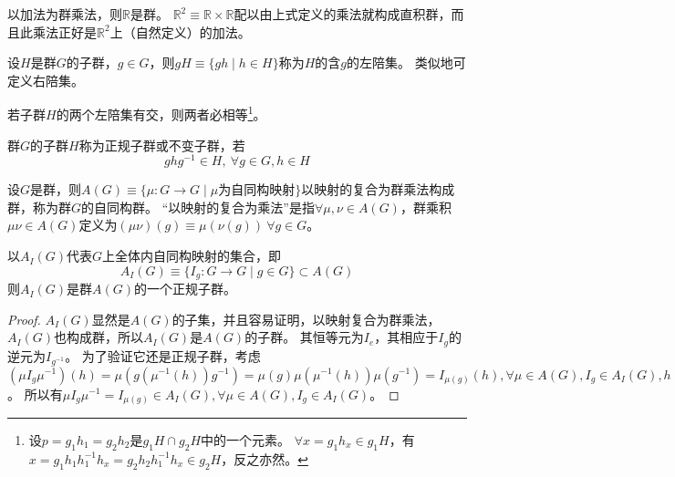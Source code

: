 \begin{example}
    以加法为群乘法，则$\mathbb{R}$是群。
    $\mathbb{R}^2 \equiv \mathbb{R} \times \mathbb{R}$配以由上式定义的乘法就构成直积群，而且此乘法正好是$\mathbb{R}^2$上（自然定义）的加法。
\end{example}

\begin{definition}
    设$H$是群$G$的子群，$g \in G$，则$gH \equiv \{gh \mid h \in H\}$称为$H$的含$g$的左陪集。
    类似地可定义右陪集。
\end{definition}

\begin{note}
    若子群$H$的两个左陪集有交，则两者必相等\footnote{
        设$p = g_1h_1 = g_2h_2$是$g_1H \cap g_2H$中的一个元素。
        $\forall x = g_1h_x \in g_1H$，有$x = g_1h_1h_1^{-1}h_x = g_2h_2h_1^{-1}h_x \in g_2H$，反之亦然。
    }。
\end{note}

\begin{definition}
    群$G$的子群$H$称为正规子群或不变子群，若
    $$ghg^{-1} \in H, ~ \forall g \in G, h \in H$$
\end{definition}

\begin{definition}
    设$G$是群，则$A(G) \equiv \{\mu \colon G \to G \mid \mu \text{为自同构映射}\}$以映射的复合为群乘法构成群，称为群$G$的自同构群。
    ``以映射的复合为乘法''是指$\forall \mu, \nu \in A(G)$，群乘积$\mu\nu \in A(G)$定义为$(\mu\nu)(g) \equiv \mu(\nu(g)) ~ \forall g \in G$。
\end{definition}

\begin{theorem}
    以$A_I(G)$代表$G$上全体内自同构映射的集合，即
    $$A_I(G) \equiv \{I_g \colon G \to G \mid g \in G\} \subset A(G)$$
    则$A_I(G)$是群$A(G)$的一个正规子群。
\end{theorem}

\begin{proof}
    $A_I(G)$显然是$A(G)$的子集，并且容易证明，以映射复合为群乘法，$A_I(G)$也构成群，所以$A_I(G)$是$A(G)$的子群。
    其恒等元为$I_e$，其相应于$I_g$的逆元为$I_{g^{-1}}$。
    为了验证它还是正规子群，考虑$(\mu I_g \mu^{-1})(h) = \mu(g(\mu^{-1}(h))g^{-1}) = \mu(g)\mu(\mu^{-1}(h))\mu(g^{-1}) = I_{\mu(g)}(h), \forall \mu \in A(G), I_g \in A_I(G), h \in G$。
    所以有$\mu I_g \mu^{-1} = I_{\mu(g)} \in A_I(G), \forall \mu \in A(G), I_g \in A_I(G)$。
\end{proof}


